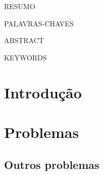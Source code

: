 \documentclass[12pt,nodisplayskipstretch]{article}
\begin{document}
\newpage
\thispagestyle{empty}
\begin{center}
    \uppercase{Resumo}
\end{center}
\lipsum[1]

\begin{center}
    \uppercase{Palavras-chaves}
\end{center}


\newpage
\thispagestyle{empty}
\begin{center}
    \uppercase{Abstract}
\end{center}
\lipsum[1]

\begin{center}
    \uppercase{Keywords}
\end{center}

\newpage
\thispagestyle{empty}
\listoffigures
\newpage

\newpage
\thispagestyle{empty}
\listoftables
\newpage

\thispagestyle{empty}
\printnomenclature
\newpage


\newpage

\thispagestyle{empty}
\tableofcontents
\newpage

\section{Introdução}
\lipsum[1]
\cite{Lorem}

\newpage

\section{Problemas}
\lipsum[1]

\subsection{Outros problemas}
\lipsum[1]
\end{document}
